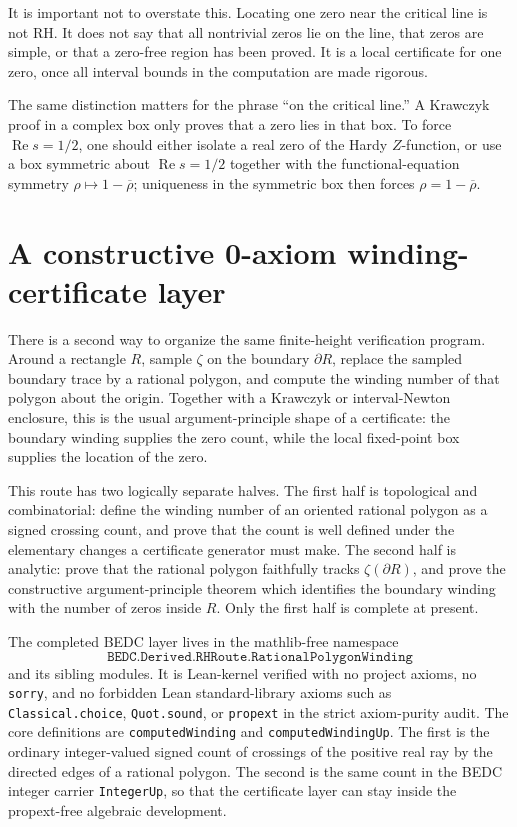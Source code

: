 \documentclass[11pt]{article}
\newcommand{\zetaR}{\zeta}
\begin{document}
It is important not to overstate this.  Locating one zero near the critical
line is not RH.  It does not say that all nontrivial zeros lie on the line,
that zeros are simple, or that a zero-free region has been proved.  It is a
local certificate for one zero, once all interval bounds in the computation
are made rigorous.

The same distinction matters for the phrase ``on the critical line.''  A
Krawczyk proof in a complex box only proves that a zero lies in that box.  To
force $\operatorname{Re}s=1/2$, one should either isolate a real zero of the
Hardy $Z$-function, or use a box symmetric about $\operatorname{Re}s=1/2$
together with the functional-equation symmetry
$\rho\mapsto 1-\overline{\rho}$; uniqueness in the symmetric box then forces
$\rho=1-\overline{\rho}$.

\section{A constructive 0-axiom winding-certificate layer}

There is a second way to organize the same finite-height verification
program.  Around a rectangle $R$, sample $\zetaR$ on the boundary
$\partial R$, replace the sampled boundary trace by a rational polygon, and
compute the winding number of that polygon about the origin.  Together with a
Krawczyk or interval-Newton enclosure, this is the usual argument-principle
shape of a certificate: the boundary winding supplies the zero count, while
the local fixed-point box supplies the location of the zero.

This route has two logically separate halves.  The first half is topological
and combinatorial: define the winding number of an oriented rational polygon
as a signed crossing count, and prove that the count is well defined under
the elementary changes a certificate generator must make.  The second half is
analytic: prove that the rational polygon faithfully tracks
$\zetaR(\partial R)$, and prove the constructive argument-principle theorem
which identifies the boundary winding with the number of zeros inside $R$.
Only the first half is complete at present.

The completed BEDC layer lives in the mathlib-free namespace
$$
  \texttt{BEDC.Derived.RHRoute.RationalPolygonWinding}
$$
and its sibling modules.  It is Lean-kernel verified with no project axioms,
no \texttt{sorry}, and no forbidden Lean standard-library axioms such as
\texttt{Classical.choice}, \texttt{Quot.sound}, or \texttt{propext} in the
strict axiom-purity audit.  The core definitions are
\texttt{computedWinding} and \texttt{computedWindingUp}.  The first is the
ordinary integer-valued signed count of crossings of the positive real ray by
the directed edges of a rational polygon.  The second is the same count in
the BEDC integer carrier \texttt{IntegerUp}, so that the certificate layer
can stay inside the propext-free algebraic development.
\end{document}
